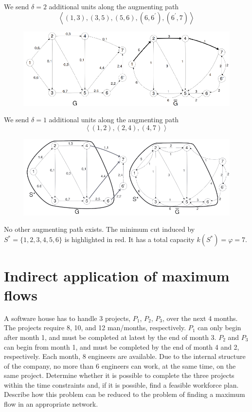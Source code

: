 \documentclass[12pt, a4paper]{report}
\newtheorem[style=M,bodystyle=\normalfont]{theorem}{Theorem}
\newtheorem[style=M,bodystyle=\normalfont]{corollary}{Corollary}
\newtheorem[style=M,bodystyle=\normalfont]{lemma}{Lemma}
\newtheorem[style=M,bodystyle=\normalfont]{definition}{Definition}
\begin{document}
        We send $\delta = 2$ additional units along the augmenting path \[\left\langle (1, 3),(3, 5),(5, 6),(6, 6^{'}),(6^{'}, 7)\right\rangle\]
        \begin{figure}[H]
            \centering
            \includegraphics[width=0.9\linewidth]{images/max3.png}
        \end{figure}
        We send $\delta = 1$ additional units along the augmenting path \[\left\langle (1, 2),(2, 4),(4, 7) \right\rangle\]
        \begin{figure}[H]
            \centering
            \includegraphics[width=0.9\linewidth]{images/max4.png}
        \end{figure}
        No other augmenting path exists. The minimum cut induced by $S^{*} = \{1, 2, 3, 4, 5, 6\}$ is highlighted in red. It has a total capacity $k(S^{*}) = \varphi = 7$.
  
    \newpage 

    \section{Indirect application of maximum flows}
        A software house has to handle 3 projects, $P_1$, $P_2$, $P_3$, over the next 4 months. The projects require 8, 10, and 12 man/months, respectively. $P_1$ can only 
        begin after month 1, and must be completed at latest by the end of month 3. $P_2$ and $P_3$ can begin from month 1, and must be completed by the end of month 4 and 
        2, respectively. Each month, 8 engineers are available. Due to the internal structure of the company, no more than 6 engineers can work, at the same time, on the 
        same project. Determine whether it is possible to complete the three projects within the time constraints and, if it is possible, find a feasible workforce plan. 
        Describe how this problem can be reduced to the problem of finding a maximum flow in an appropriate network.
\end{document}
